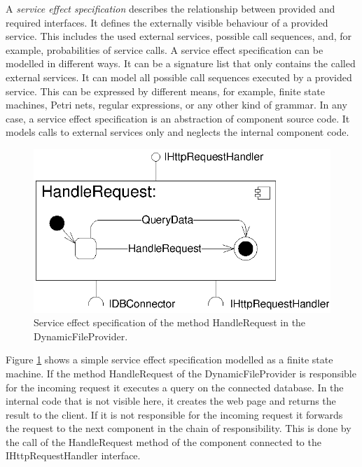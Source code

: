 A \emph{service effect specification} describes the relationship between
provided and required interfaces. It defines the externally visible behaviour of
a provided service. This includes the used external services, possible call
sequences, and, for example, probabilities of service calls. A service effect
specification can be modelled in different ways. It can be a signature list that
only contains the called external services. It can model all possible call
sequences executed by a provided service. This can be expressed by different
means, for example, finite state machines, Petri nets, regular expressions, or
any other kind of grammar. In any case, a service effect specification is an
abstraction of component source code. It models calls to external services only
and neglects the internal component code.

\begin{figure}[htbp]
\centering
\includegraphics[scale=0.85]{example/HandleRequestSEFF}
\caption{Service effect specification of the method HandleRequest in the
DynamicFileProvider.}
\label{fig:seff}
\end{figure}

Figure \ref{fig:seff} shows a simple service effect specification modelled as a
finite state machine. If the method HandleRequest of the DynamicFileProvider is
responsible for the incoming request it executes a query on the connected
database. In the internal code that is not visible here, it creates the web page
and returns the result to the client. If it is not responsible for the incoming
request it forwards the request to the next component in the chain of
responsibility. This is done by the call of the HandleRequest method of the
component connected to the IHttpRequestHandler interface.


